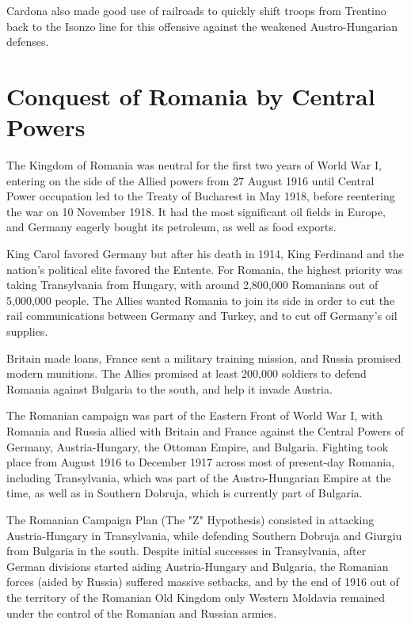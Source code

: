 \documentclass[a4paper,]{book}
\begin{document}
Cardona also made good use of railroads to quickly shift troops from Trentino back to the Isonzo line for this offensive against the weakened Austro-Hungarian defenses. 

\section{Conquest of Romania by Central Powers}

The Kingdom of Romania was neutral for the first two years of World War I, entering on the side of the Allied powers from 27 August 1916 until Central Power occupation led to the Treaty of Bucharest in May 1918, before reentering the war on 10 November 1918. It had the most significant oil fields in Europe, and Germany eagerly bought its petroleum, as well as food exports.

King Carol favored Germany but after his death in 1914, King Ferdinand and the nation's political elite favored the Entente. For Romania, the highest priority was taking Transylvania from Hungary, with around 2,800,000 Romanians out of 5,000,000 people. The Allies wanted Romania to join its side in order to cut the rail communications between Germany and Turkey, and to cut off Germany's oil supplies.

Britain made loans, France sent a military training mission, and Russia promised modern munitions. The Allies promised at least 200,000 soldiers to defend Romania against Bulgaria to the south, and help it invade Austria.

The Romanian campaign was part of the Eastern Front of World War I, with Romania and Russia allied with Britain and France against the Central Powers of Germany, Austria-Hungary, the Ottoman Empire, and Bulgaria. Fighting took place from August 1916 to December 1917 across most of present-day Romania, including Transylvania, which was part of the Austro-Hungarian Empire at the time, as well as in Southern Dobruja, which is currently part of Bulgaria.

The Romanian Campaign Plan (The "Z" Hypothesis) consisted in attacking Austria-Hungary in Transylvania, while defending Southern Dobruja and Giurgiu from Bulgaria in the south. Despite initial successes in Transylvania, after German divisions started aiding Austria-Hungary and Bulgaria, the Romanian forces (aided by Russia) suffered massive setbacks, and by the end of 1916 out of the territory of the Romanian Old Kingdom only Western Moldavia remained under the control of the Romanian and Russian armies.
\end{document}
